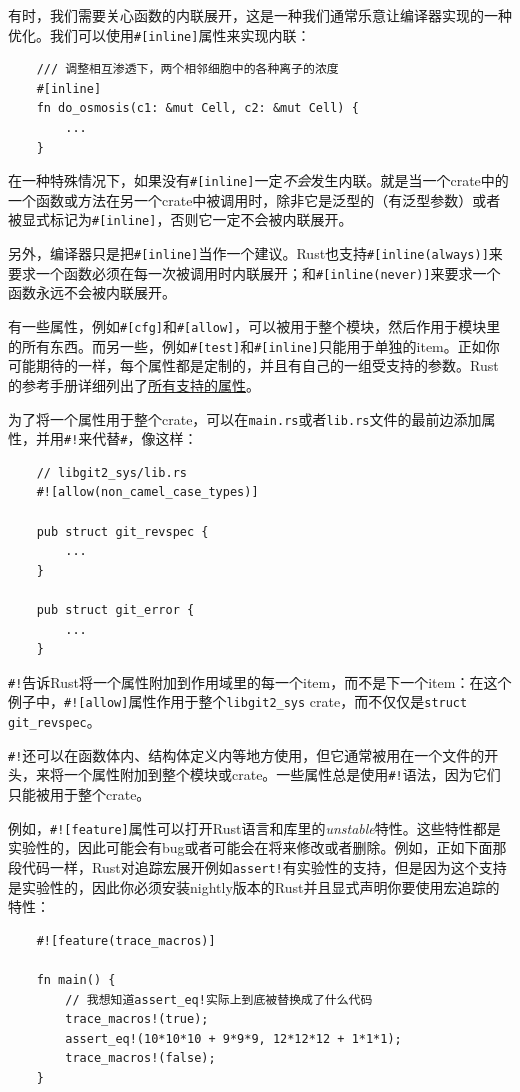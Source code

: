 有时，我们需要关心函数的内联展开，这是一种我们通常乐意让编译器实现的一种优化。我们可以使用\texttt{\#[inline]}属性来实现内联：
\begin{verbatim}
    /// 调整相互渗透下，两个相邻细胞中的各种离子的浓度
    #[inline]
    fn do_osmosis(c1: &mut Cell, c2: &mut Cell) {
        ...
    }
\end{verbatim}

在一种特殊情况下，如果没有\texttt{\#[inline]}一定\emph{不会}发生内联。就是当一个crate中的一个函数或方法在另一个crate中被调用时，除非它是泛型的（有泛型参数）或者被显式标记为\texttt{\#[inline]}，否则它一定不会被内联展开。

另外，编译器只是把\texttt{\#[inline]}当作一个建议。Rust也支持\texttt{\#[inline(always)]}来要求一个函数必须在每一次被调用时内联展开；和\texttt{\#[inline(never)]}来要求一个函数永远不会被内联展开。

有一些属性，例如\texttt{\#[cfg]}和\texttt{\#[allow]}，可以被用于整个模块，然后作用于模块里的所有东西。而另一些，例如\texttt{\#[test]}和\texttt{\#[inline]}只能用于单独的item。正如你可能期待的一样，每个属性都是定制的，并且有自己的一组受支持的参数。Rust的参考手册详细列出了\href{https://doc.rust-lang.org/reference/attributes.html}{所有支持的属性}。

为了将一个属性用于整个crate，可以在\texttt{main.rs}或者\texttt{lib.rs}文件的最前边添加属性，并用\texttt{\#!}来代替\texttt{\#}，像这样：
\begin{verbatim}
    // libgit2_sys/lib.rs
    #![allow(non_camel_case_types)]

    pub struct git_revspec {
        ...
    }

    pub struct git_error {
        ...
    }
\end{verbatim}

\texttt{\#!}告诉Rust将一个属性附加到作用域里的每一个item，而不是下一个item：在这个例子中，\texttt{\#![allow]}属性作用于整个\texttt{libgit2\_sys} crate，而不仅仅是\texttt{struct git\_revspec}。

\texttt{\#!}还可以在函数体内、结构体定义内等地方使用，但它通常被用在一个文件的开头，来将一个属性附加到整个模块或crate。一些属性总是使用\texttt{\#!}语法，因为它们只能被用于整个crate。

例如，\texttt{\#![feature]}属性可以打开Rust语言和库里的\emph{unstable}特性。这些特性都是实验性的，因此可能会有bug或者可能会在将来修改或者删除。例如，正如下面那段代码一样，Rust对追踪宏展开例如\texttt{assert!}有实验性的支持，但是因为这个支持是实验性的，因此你必须安装nightly版本的Rust并且显式声明你要使用宏追踪的特性：
\begin{verbatim}
    #![feature(trace_macros)]
    
    fn main() {
        // 我想知道assert_eq!实际上到底被替换成了什么代码
        trace_macros!(true);
        assert_eq!(10*10*10 + 9*9*9, 12*12*12 + 1*1*1);
        trace_macros!(false);
    }
\end{verbatim}

